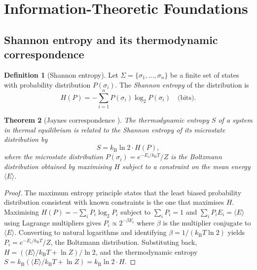 \documentclass[twocolumn,10pt,a4paper]{article}
\newtheorem{theorem}{Theorem}[section]
\theoremstyle{definition}
\newtheorem{definition}[theorem]{Definition}
\theoremstyle{remark}
\newcommand{\kB}{k_{\mathrm{B}}}
\begin{document}
\section{Information-Theoretic Foundations}\label{sec:information}

\subsection{Shannon entropy and its thermodynamic correspondence}

\begin{definition}[Shannon entropy]\label{def:shannon}
Let $\Sigma = \{\sigma_1, \ldots, \sigma_n\}$ be a finite set of states with probability distribution $P(\sigma_i)$. The \emph{Shannon entropy} \citep{Shannon1948} of the distribution is
\begin{equation}\label{eq:shannon}
H(P) = -\sum_{i=1}^{n} P(\sigma_i) \log_2 P(\sigma_i) \quad \text{(bits)}.
\end{equation}
\end{definition}

\begin{theorem}[Jaynes correspondence \citep{Jaynes1957a}]\label{thm:jaynes}
The thermodynamic entropy $S$ of a system in thermal equilibrium is related to the Shannon entropy of its microstate distribution by
\begin{equation}\label{eq:jaynes}
S = \kB \ln 2 \cdot H(P),
\end{equation}
where the microstate distribution $P(\sigma_i) = e^{-E_i/\kB T} / Z$ is the Boltzmann distribution obtained by maximising $H$ subject to a constraint on the mean energy $\langle E \rangle$.
\end{theorem}

\begin{proof}
The maximum entropy principle \citep{Jaynes1957a, Jaynes1957b} states that the least biased probability distribution consistent with known constraints is the one that maximises $H$. Maximising $H(P) = -\sum_i P_i \log_2 P_i$ subject to $\sum_i P_i = 1$ and $\sum_i P_i E_i = \langle E \rangle$ using Lagrange multipliers gives $P_i \propto 2^{-\beta E_i}$ where $\beta$ is the multiplier conjugate to $\langle E \rangle$. Converting to natural logarithms and identifying $\beta = 1/(\kB T \ln 2)$ yields $P_i = e^{-E_i/\kB T}/Z$, the Boltzmann distribution. Substituting back, $H = (\langle E \rangle / \kB T + \ln Z) / \ln 2$, and the thermodynamic entropy $S = \kB(\langle E \rangle / \kB T + \ln Z) = \kB \ln 2 \cdot H$.
\end{proof}
\end{document}
